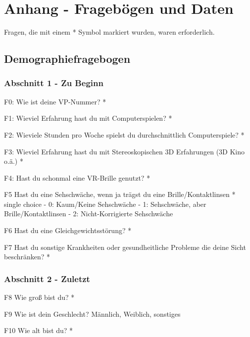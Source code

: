 \chapter*{Anhang - Fragebögen und Daten}
\label{anhang}

Fragen, die mit einem * Symbol markiert wurden, waren erforderlich.
\section*{Demographiefragebogen}
\label{anhang:demo}

\subsection*{Abschnitt 1 - Zu Beginn}

F0: Wie ist deine VP-Nummer? *

F1: Wieviel Erfahrung hast du mit Computerspielen? *

F2: Wieviele Stunden pro Woche spielst du durchschnittlich Computerspiele? *

F3: Wieviel Erfahrung hast du mit Stereoskopischen 3D Erfahrungen (3D Kino o.ä.) *

F4: Hast du schonmal eine VR-Brille genutzt? *

F5 Hast du eine Sehschwäche, wenn ja trägst du eine Brille/Kontaktlinsen *
single choice
- 0: Kaum/Keine Sehschwäche
- 1: Sehschwäche, aber Brille/Kontaktlinsen
- 2: Nicht-Korrigierte Sehschwäche

F6 Hast du eine Gleichgewichtsstörung? *

F7 Hast du sonstige Krankheiten oder gesundheitliche Probleme die deine Sicht beschränken? *

\subsection*{Abschnitt 2 - Zuletzt}

F8 Wie groß bist du? *

F9 Wie ist dein Geschlecht?
Männlich, Weiblich, sonstiges

F10 Wie alt bist du? *

